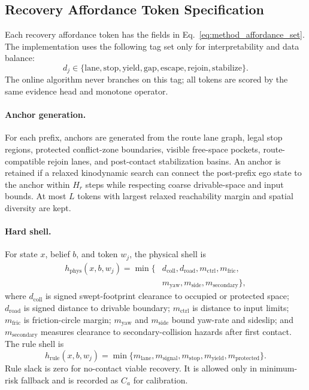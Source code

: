 \documentclass[conference]{IEEEtran}
\begin{document}
\subsection{Recovery Affordance Token Specification}
\label{app:recovery_affordances}

Each recovery affordance token has the fields in Eq.~\eqref{eq:method_affordance_set}.  The implementation uses the following tag set only for interpretability and data balance:
\begin{equation}
\label{eq:app_tag_set_new}
    d_j\in\{\mathrm{lane},\mathrm{stop},\mathrm{yield},\mathrm{gap},\mathrm{escape},\mathrm{rejoin},\mathrm{stabilize}\}.
\end{equation}
The online algorithm never branches on this tag; all tokens are scored by the same evidence head and monotone operator.

\paragraph{Anchor generation.}
For each prefix, anchors are generated from the route lane graph, legal stop regions, protected conflict-zone boundaries, visible free-space pockets, route-compatible rejoin lanes, and post-contact stabilization basins.  An anchor is retained if a relaxed kinodynamic search can connect the post-prefix ego state to the anchor within $H_r$ steps while respecting coarse drivable-space and input bounds.  At most $L$ tokens with largest relaxed reachability margin and spatial diversity are kept.

\paragraph{Hard shell.}
For state $x$, belief $b$, and token $w_j$, the physical shell is
\begin{equation}
\label{eq:app_phys_shell_new}
\begin{split}
    h_{\mathrm{phys}}(x,b,w_j)=\min\{&d_{\mathrm{coll}},d_{\mathrm{road}},m_{\mathrm{ctrl}},m_{\mathrm{fric}},\\
    &m_{\mathrm{yaw}},m_{\mathrm{side}},m_{\mathrm{secondary}}\},
\end{split}
\end{equation}
where $d_{\mathrm{coll}}$ is signed swept-footprint clearance to occupied or protected space; $d_{\mathrm{road}}$ is signed distance to drivable boundary; $m_{\mathrm{ctrl}}$ is distance to input limits; $m_{\mathrm{fric}}$ is friction-circle margin; $m_{\mathrm{yaw}}$ and $m_{\mathrm{side}}$ bound yaw-rate and sideslip; and $m_{\mathrm{secondary}}$ measures clearance to secondary-collision hazards after first contact.  The rule shell is
\begin{equation}
\label{eq:app_rule_shell_new}
    h_{\mathrm{rule}}(x,b,w_j)=\min\{m_{\mathrm{lane}},m_{\mathrm{signal}},m_{\mathrm{stop}},m_{\mathrm{yield}},m_{\mathrm{protected}}\}.
\end{equation}
Rule slack is zero for no-contact viable recovery.  It is allowed only in minimum-risk fallback and is recorded as $C_a$ for calibration.
\end{document}
